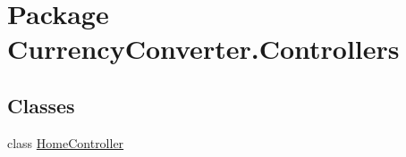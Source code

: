 \hypertarget{namespace_currency_converter_1_1_controllers}{\section{Package Currency\-Converter.\-Controllers}
\label{namespace_currency_converter_1_1_controllers}
}
\subsection*{Classes}
\begin{DoxyCompactItemize}
\item 
class \hyperlink{class_currency_converter_1_1_controllers_1_1_home_controller}{Home\-Controller}
\end{DoxyCompactItemize}
